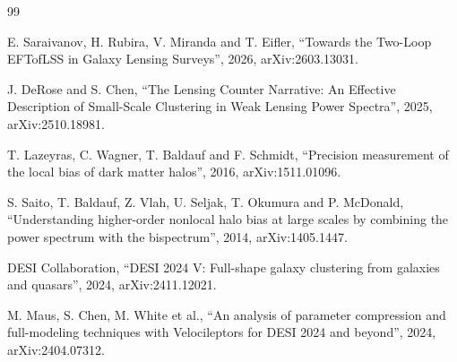 \documentclass[11pt]{article}
\begin{document}
\begin{thebibliography}{99}

E. Saraivanov, H. Rubira, V. Miranda and T. Eifler,
``Towards the Two-Loop EFTofLSS in Galaxy Lensing Surveys'',
2026, arXiv:2603.13031.

J. DeRose and S. Chen,
``The Lensing Counter Narrative: An Effective Description of
Small-Scale Clustering in Weak Lensing Power Spectra'',
2025, arXiv:2510.18981.

T. Lazeyras, C. Wagner, T. Baldauf and F. Schmidt,
``Precision measurement of the local bias of dark matter halos'',
2016, arXiv:1511.01096.

S. Saito, T. Baldauf, Z. Vlah, U. Seljak, T. Okumura and P. McDonald,
``Understanding higher-order nonlocal halo bias at large scales by
combining the power spectrum with the bispectrum'',
2014, arXiv:1405.1447.

DESI Collaboration,
``DESI 2024 V: Full-shape galaxy clustering from galaxies and
quasars'',
2024, arXiv:2411.12021.

M. Maus, S. Chen, M. White et al.,
``An analysis of parameter compression and full-modeling techniques
with Velocileptors for DESI 2024 and beyond'',
2024, arXiv:2404.07312.

\end{thebibliography}
\end{document}
